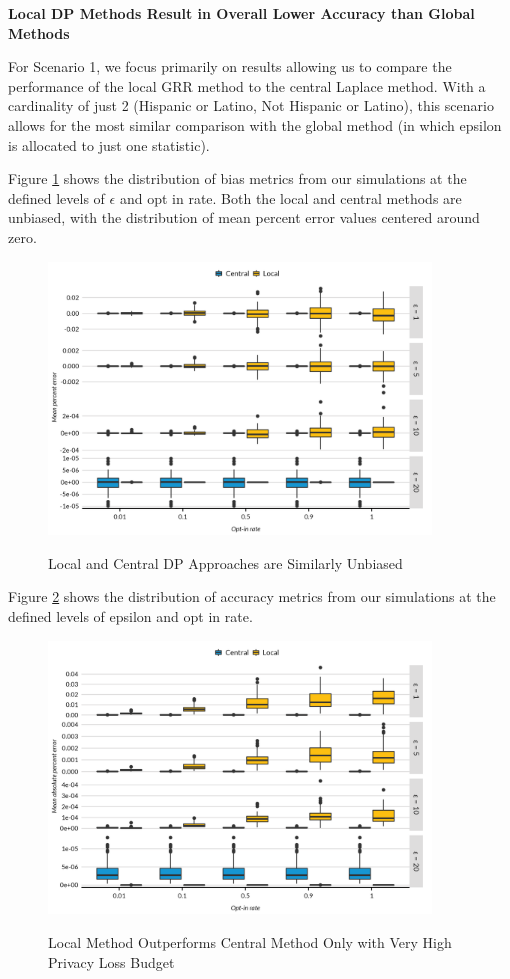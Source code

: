 \documentclass[
]{urban-formatting}
\begin{document}
\textbf{Local DP Methods Result in Overall Lower Accuracy than Global
Methods}

For Scenario 1, we focus primarily on results allowing us to compare the
performance of the local GRR method to the central Laplace method. With
a cardinality of just 2 (Hispanic or Latino, Not Hispanic or Latino),
this scenario allows for the most similar comparison with the global
method (in which epsilon is allocated to just one statistic).~

Figure \ref{fig:methods-bias} shows the distribution of bias metrics
from our simulations at the defined levels of \(\epsilon\) and opt in
rate. Both the local and central methods are unbiased, with the
distribution of mean percent error values centered around zero.~

\begin{figure}[!htb]
    \centering
    \caption{Local and Central DP Approaches are Similarly Unbiased}
    \includegraphics[width=4in]{../figures/methods_bias.png}
    \label{fig:methods-bias}
\end{figure}

Figure \ref{fig:methods-accuracy} shows the distribution of accuracy
metrics from our simulations at the defined levels of epsilon and opt in
rate.~

\begin{figure}[!htb]
    \centering
    \caption{Local Method Outperforms Central Method Only with Very High Privacy Loss Budget}
    \includegraphics[width=4in]{../figures/methods_accuracy.png}
    \label{fig:methods-accuracy}
\end{figure}
\end{document}
